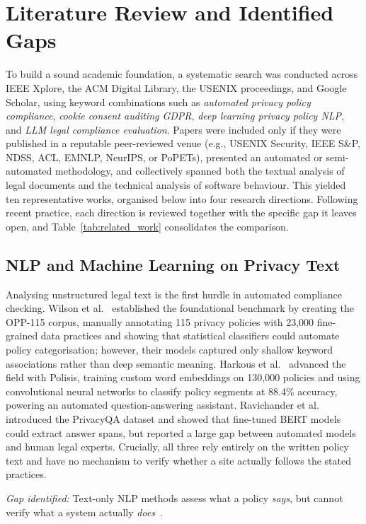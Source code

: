 \documentclass[conference]{IEEEtran}
\begin{document}
\section{Literature Review and Identified Gaps}
\label{sec:litreview}
To build a sound academic foundation, a systematic search was conducted across IEEE Xplore, the ACM Digital Library, the USENIX proceedings, and Google Scholar, using keyword combinations such as \textit{automated privacy policy compliance}, \textit{cookie consent auditing GDPR}, \textit{deep learning privacy policy NLP}, and \textit{LLM legal compliance evaluation}. Papers were included only if they were published in a reputable peer-reviewed venue (e.g., USENIX Security, IEEE S\&P, NDSS, ACL, EMNLP, NeurIPS, or PoPETs), presented an automated or semi-automated methodology, and collectively spanned both the textual analysis of legal documents and the technical analysis of software behaviour. This yielded ten representative works, organised below into four research directions. Following recent practice, each direction is reviewed together with the specific gap it leaves open, and Table~\ref{tab:related_work} consolidates the comparison.

\subsection{NLP and Machine Learning on Privacy Text}
Analysing unstructured legal text is the first hurdle in automated compliance checking. Wilson et al.~\cite{wilson-2016-opp115} established the foundational benchmark by creating the OPP-115 corpus, manually annotating 115 privacy policies with 23,000 fine-grained data practices and showing that statistical classifiers could automate policy categorisation; however, their models captured only shallow keyword associations rather than deep semantic meaning. Harkous et al.~\cite{harkous-2018-polisis} advanced the field with Polisis, training custom word embeddings on 130,000 policies and using convolutional neural networks to classify policy segments at 88.4\% accuracy, powering an automated question-answering assistant. Ravichander et al.~\cite{ravichander-2019-privacyqa} introduced the PrivacyQA dataset and showed that fine-tuned BERT models could extract answer spans, but reported a large gap between automated models and human legal experts. Crucially, all three rely entirely on the written policy text and have no mechanism to verify whether a site actually follows the stated practices.

\noindent\textit{Gap identified:} Text-only NLP methods assess what a policy \emph{says}, but cannot verify what a system actually \emph{does}~\cite{wilson-2016-opp115,harkous-2018-polisis,ravichander-2019-privacyqa}.
\end{document}

